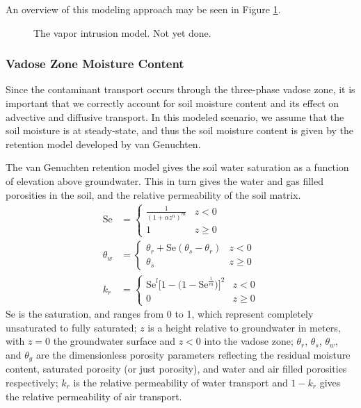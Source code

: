An overview of this modeling approach may be seen in Figure \ref{fig:model}.\par

\begin{figure}
  \caption{The vapor intrusion model. Not yet done.}
  \label{fig:model}
\end{figure}

\subsubsection{Vadose Zone Moisture Content}\label{sec:van_genuchten}

Since the contaminant transport occurs through the three-phase vadose zone, it is important that we correctly account for soil moisture content and its effect on advective and diffusive transport.
In this modeled scenario, we assume that the soil moisture is at steady-state, and thus the soil moisture content is given by the retention model developed by van Genuchten\cite{van_genuchten_closed-form_1980}.\par

The van Genuchten retention model gives the soil water saturation as a function of elevation above groundwater.
This in turn gives the water and gas filled porosities in the soil, and the relative permeability of the soil matrix.
\begin{align}
  \mathrm{Se} &=
    \begin{cases}\label{eq:van_genuchten_saturation}
      \frac{1}{(1 + \alpha z^n)^m} & z < 0 \\
    1 & z \geq 0
    \end{cases} \\
  \theta_w &=
    \begin{cases}\label{eq:van_genuchten_soil_moisture}
      \theta_r + \mathrm{Se}(\theta_s - \theta_r) & z < 0 \\
      \theta_s & z \geq 0
    \end{cases} \\
  k_r &=
    \begin{cases}\label{eq:van_genuchten_relative_permeability}
      \mathrm{Se}^l \big[ 1 - \big( 1 - \mathrm{Se}^\frac{1}{m} \big) \big]^2 & z < 0 \\
      0 & z \geq 0
    \end{cases}
\end{align}
$\mathrm{Se}$ is the saturation, and ranges from 0 to 1, which represent completely unsaturated to fully saturated;
$z$ is a height relative to groundwater in meters, with $z=0$ the groundwater surface and $z<0$ into the vadose zone;
$\theta_r$, $\theta_s$, $\theta_w$, and $\theta_g$ are the dimensionless porosity parameters reflecting the residual moisture content, saturated porosity (or just porosity), and water and air filled porosities respectively;
$k_r$ is the relative permeability of water transport and $1-k_r$ gives the relative permeability of air transport.\par

